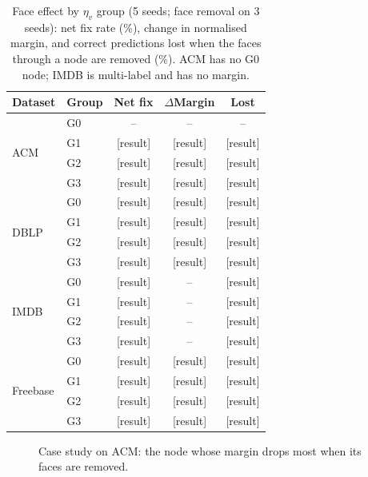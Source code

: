 \documentclass{article}
\newcommand{\res}{{\scriptsize[result]}}
\begin{document}
\begin{table}[!htbp]
  \centering
  \caption{Face effect by $\eta_v$ group (5 seeds; face removal on 3 seeds): net fix rate (\%), change in normalised margin, and correct predictions lost when the faces through a node are removed (\%). ACM has no G0 node; IMDB is multi-label and has no margin.}
  \label{tab:face}
  \scriptsize
  \setlength{\tabcolsep}{3pt}
  \begin{tabular}{llccc}
    \toprule
    \textbf{Dataset} & \textbf{Group} & Net fix & $\Delta$Margin & Lost \\
    \midrule
    \multirow{4}{*}{ACM} & G0 & -- & -- & -- \\
    & G1 & \res & \res & \res \\
    & G2 & \res & \res & \res \\
    & G3 & \res & \res & \res \\
    \midrule
    \multirow{4}{*}{DBLP} & G0 & \res & \res & \res \\
    & G1 & \res & \res & \res \\
    & G2 & \res & \res & \res \\
    & G3 & \res & \res & \res \\
    \midrule
    \multirow{4}{*}{IMDB} & G0 & \res & -- & \res \\
    & G1 & \res & -- & \res \\
    & G2 & \res & -- & \res \\
    & G3 & \res & -- & \res \\
    \midrule
    \multirow{4}{*}{Freebase} & G0 & \res & \res & \res \\
    & G1 & \res & \res & \res \\
    & G2 & \res & \res & \res \\
    & G3 & \res & \res & \res \\
    \bottomrule
  \end{tabular}
\end{table}

\begin{figure}[!htbp]
  \centering
  \caption{Case study on ACM: the node whose margin drops most when its faces are removed.}
  \label{fig:case}
\end{figure}
\end{document}
